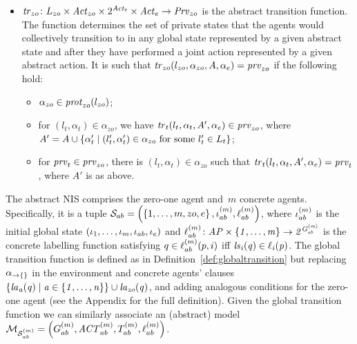 \begin{definition}
\begin{itemize}[$\bullet$]
    \item $\mathit{tr}_{zo} \colon L_{zo} \times \mathit{Act}_{zo} \times 2^{\mathit{Act}_{t}} 
    \times \mathit{Act}_{e} \rightarrow \mathit{Prv}_{zo}$ is the abstract transition function.
    The function determines the set of private states that the agents would
    collectively transition to in any global state represented by a given
    abstract state and after they have performed a joint action represented by a
    given abstract action. It is such that $\mathit{tr}_{zo}(l_{zo}, \alpha_{zo}, A, \alpha_e)
    = \mathit{prv}_{zo}$ if the following hold:
    \begin{itemize}[\textbf{--}]
    \item $\alpha_{zo} \in \mathit{prot}_{zo}(l_{zo})$; 
    \item for $(l_t, \alpha_t) \in \alpha_{zo}$, we have
      $\mathit{tr}_{t}(l_t, \alpha_t, A', \alpha_e) \in \mathit{prv}_{zo}$, where
      $A' = A \cup \left \{ \alpha'_t \mid (l'_t, \alpha'_t) \in \alpha_{zo} \text{
          for some } l'_t \in L_{t} \right \}$;
    \item for $\mathit{prv}_{t} \in \mathit{prv}_{zo}$, there is
      $(l_t, \alpha_t) \in \alpha_{zo}$ such that
      $\mathit{tr}_{t}(l_t, \alpha_t, A', \alpha_e) = \mathit{prv}_{t}$, where $A'$ is as above.
    \end{itemize}
\end{itemize}
\end{definition}

The abstract  NIS comprises the zero-one agent and~$m$ concrete agents. Specifically, it is a
tuple $\mathcal S_{ab} = \left ( \left \{ 1,\ldots,m,zo,e \right \}, \iota^{({m})}_{ab},
\ell^{(m)}_{ab} \right )$, where $\iota^{({m})}_{ab}$ is the initial global state $\left ( \iota_{1}, \ldots, \iota_{m}, \iota_{ab}, \iota_{e} \right )$  and $\ell^{(m)}_{ab} \colon
\it{AP} \times \left \{ 1, \ldots, m  \right \} \rightarrow 2^{G^{(m)}_{ab}}$ is the
concrete labelling function satisfying $q \in \ell^{(m)}_{ab}(p,i)$ iff
$\it{ls}_{i}(q) \in \ell_{i}(p)$.  The global transition function is defined as in
Definition~\ref{def:globaltransition} but replacing $\alpha_{\rightarrow\{\}}$ in
the environment and concrete agents' clauses $\left \{ \it{la}_{a}({q}) \mid a \in
\left \{ 1,\ldots,n \right \} \right \} \cup \it{la}_{zo}({q})$,  and adding analogous conditions for the
zero-one agent (see the Appendix for the full definition). Given the global
transition function we can similarly associate an (abstract) model  $\mathcal{M}_{\mathcal{S}_{ab}^{(m)}} =
\left ( G^{(m)}_{ab}, \mathit{ACT}^{(m)}_{ab}, T^{(m)}_{ab}, \ell^{(m)}_{ab} \right )$.

